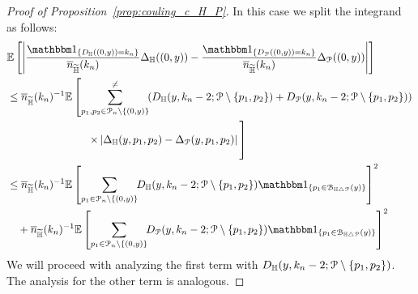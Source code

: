 \begin{proof}[Proof of Proposition~\ref{prop:couling_c_H_P}]
In this case we split the integrand as follows:
\begin{align*}
	&\Exp{\left|\frac{\ind{D_\H((0,y)) = k_n}}{\expH} \Delta_\H ((0,y)) 
		- \frac{\ind{D_\Pcal((0,y)) = k_n}}{\expH} \Delta_\Pcal ((0,y))\right|}\\
	&\le \expH^{-1} {\mathbb{E}}\left[\sum_{p_1, p_2\in \Pcal_n \setminus \{(0,y)\}}^{\ne} \hspace{-3pt} 
		\left(D_{\H}(y,k_n-2;\Pcal \setminus \{p_1,p_2\})+ D_{\Pcal}(y,k_n-2;\Pcal \setminus \{p_1,p_2\})\right) \right.\\
	&\hspace{75pt}\left. \times	\left|\Delta_\H (y,p_1,p_2) - \Delta_\Pcal (y,p_1,p_2)\right| 
		\vphantom{\sum_{p_1, p_2\in \Pcal_n \setminus \{(0,y)\}}^{\ne}}\right]\\
	&\le \expH^{-1} \Exp{\sum_{p_1 \in \Pcal_n \setminus \{(0,y)\}} \hspace{-3pt} 
		D_{\H}(y,k_n-2;\Pcal \setminus \{p_1,p_2\}) \ind{p_1 \in \BallSym{y}}}^2\\
	&\hspace{10pt}+ \expH^{-1} \Exp{\sum_{p_1 \in \Pcal_n \setminus \{(0,y)\}} \hspace{-3pt} 
			D_{\Pcal}(y,k_n-2;\Pcal \setminus \{p_1,p_2\}) \ind{p_1 \in \BallSym{y}}}^2
\end{align*}
We will proceed with analyzing the first term with $D_{\mathbb{H}}(y,k_n-2;{\mathcal P} \setminus \{p_1,p_2\})$. The analysis for the other term is analogous.


\end{proof}
